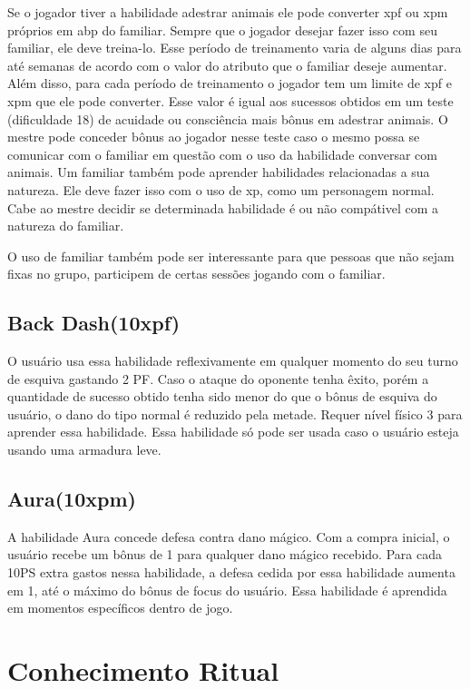 Se o jogador tiver a habilidade adestrar animais ele pode converter xpf ou xpm próprios em abp do familiar. Sempre que o jogador desejar fazer isso com seu familiar, ele deve treina-lo. Esse período de treinamento varia de alguns dias para até semanas de acordo com o valor do atributo que o familiar deseje aumentar. Além disso, para cada período de treinamento o jogador tem um limite de xpf e xpm que ele pode converter. Esse valor é igual aos sucessos obtidos em um teste (dificuldade 18) de acuidade ou consciência mais bônus em adestrar animais. O mestre pode conceder bônus ao jogador nesse teste caso o mesmo possa se comunicar com o familiar em questão com o uso da habilidade conversar com animais. Um familiar também pode aprender habilidades relacionadas a sua natureza. Ele deve fazer isso com o uso de xp, como um personagem normal. Cabe ao mestre decidir se determinada habilidade é ou não compátivel com a natureza do familiar.

O uso de familiar também pode ser interessante para que pessoas que não sejam fixas no grupo, participem de certas sessões jogando com o familiar.



\subsection {Back Dash(10xpf)}
O usuário usa essa habilidade reflexivamente em qualquer momento do seu turno de esquiva gastando 2 PF. Caso o ataque do oponente tenha êxito, porém a quantidade de sucesso obtido tenha sido menor do que o bônus de esquiva do usuário, o dano do tipo normal é reduzido pela metade. Requer nível físico 3 para aprender essa habilidade. Essa habilidade só pode ser usada caso o usuário esteja usando uma armadura leve.

\subsection {Aura(10xpm)}
A habilidade Aura concede defesa contra dano mágico. Com a compra inicial, o usuário recebe um bônus de 1 para qualquer dano mágico recebido. Para cada 10PS extra gastos nessa habilidade, a defesa cedida por essa habilidade aumenta em 1, até o máximo do bônus de focus do usuário. Essa habilidade é aprendida em momentos específicos dentro de jogo.


 
 \section{Conhecimento Ritual}
 
